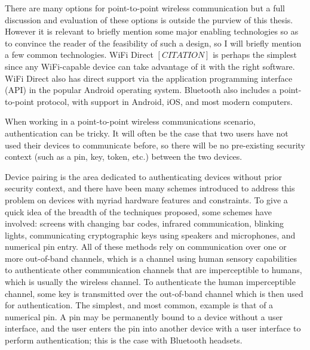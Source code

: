 \documentclass[12pt]{report}
\begin{document}
There are many options for point-to-point wireless communication but a full discussion and evaluation of these options is outside the purview of this thesis. However it is relevant to briefly mention some major enabling technologies so as to convince the reader of the feasibility of such a design, so I will briefly mention a few common technologies. WiFi Direct $[CITATION]$ is perhaps the simplest since any WiFi-capable device can take advantage of it with the right software. WiFi Direct also has direct support via the application programming interface (API) in the popular Android operating system. Bluetooth also includes a point-to-point protocol, with support in Android, iOS, and most modern computers. 

When working in a point-to-point wireless communications scenario, authentication can be tricky. It will often be the case that two users have not used their devices to communicate before, so there will be no pre-existing security context (such as a pin, key, token, etc.) between the two devices. 

Device pairing is the area dedicated to authenticating devices without prior security context, and there have been many schemes introduced to address this problem on devices with myriad hardware features and constraints. To give a quick idea of the breadth of the techniques proposed, some schemes have involved: screens with changing bar codes, infrared communication, blinking lights, communicating cryptographic keys using speakers and microphones, and numerical pin entry. All of these methods rely on communication over one or more out-of-band channels, which is a channel using human sensory capabilities to authenticate other communication channels that are imperceptible to humans, which is usually the wireless channel. To authenticate the human imperceptible channel, some key is transmitted over the out-of-band channel which is then used for authentication. The simplest, and most common, example is that of a numerical pin. A pin may be permanently bound to a device without a user interface, and the user enters the pin into another device with a user interface to perform authentication; this is the case with Bluetooth headsets.
\end{document}
